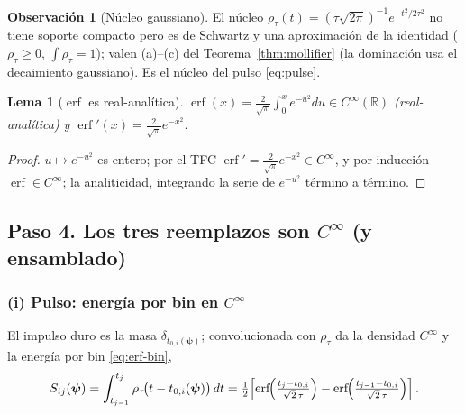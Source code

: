 \documentclass[11pt,a4paper]{article}
\theoremstyle{plain}
\newtheorem{lemma}[theorem]{Lema}
\theoremstyle{definition}
\newtheorem{remark}{Observaci\'on}
\newcommand{\vect}[1]{\boldsymbol{#1}}
\newcommand{\R}{\mathbb{R}}
\newcommand{\erf}{\operatorname{erf}}
\begin{document}
\begin{remark}[N\'ucleo gaussiano]
El n\'ucleo $\rho_\tau(t)=(\tau\sqrt{2\pi})^{-1}e^{-t^2/2\tau^2}$ no tiene soporte
compacto pero es de Schwartz y una aproximaci\'on de la identidad
($\rho_\tau\ge0$, $\int\rho_\tau=1$); valen (a)--(c) del
Teorema~\ref{thm:mollifier} (la dominaci\'on usa el decaimiento gaussiano). Es el
n\'ucleo del pulso \eqref{eq:pulse}.
\end{remark}

\begin{lemma}[$\erf$ es real-anal\'itica]\label{lem:erf}
$\erf(x)=\frac{2}{\sqrt\pi}\int_0^x e^{-u^2}du\in C^\infty(\R)$ (real-anal\'itica)
y $\erf'(x)=\frac{2}{\sqrt\pi}e^{-x^2}$.
\end{lemma}
\begin{proof}
$u\mapsto e^{-u^2}$ es entero; por el TFC $\erf'=\frac{2}{\sqrt\pi}e^{-x^2}\in
C^\infty$, y por inducci\'on $\erf\in C^\infty$; la analiticidad, integrando la
serie de $e^{-u^2}$ t\'ermino a t\'ermino.
\end{proof}

\subsection*{Paso 4. Los tres reemplazos son $C^\infty$ (y ensamblado)}
\label{sec:construccion-just}

\subsubsection*{(i) Pulso: energ\'ia por bin en $C^\infty$}

El impulso duro es la masa $\delta_{t_{0,i}(\vect{\psi})}$; convolucionada con
$\rho_\tau$ da la densidad $C^\infty$ y la energ\'ia por bin \eqref{eq:erf-bin},
\begin{equation}
    S_{ij}(\vect{\psi})
    =\int_{t_{j-1}}^{t_j}\rho_\tau\!\bigl(t-t_{0,i}(\vect{\psi})\bigr)\,dt
    =\tfrac12\!\left[
        \erf\!\Bigl(\tfrac{t_j-t_{0,i}}{\sqrt2\,\tau}\Bigr)
        -\erf\!\Bigl(\tfrac{t_{j-1}-t_{0,i}}{\sqrt2\,\tau}\Bigr)
    \right].
    \label{eq:Sij}
\end{equation}
\end{document}
